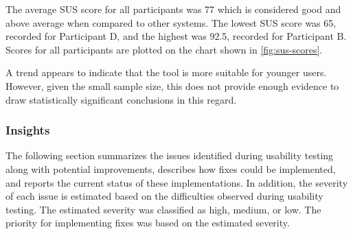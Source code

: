 The average SUS score for all participants was 77 which is considered good and above average when compared to other systems. The lowest SUS score was 65, recorded for Participant D, and the highest was 92.5, recorded for Participant B. Scores for all participants are plotted on the chart shown in \autoref{fig:sus-scores}.

A trend appears to indicate that the tool is more suitable for younger users. However, given the small sample size, this does not provide enough evidence to draw statistically significant conclusions in this regard.

\subsubsection{Insights} \label{section:insights}

The following section summarizes the issues identified during usability testing along with potential improvements, describes how fixes could be implemented, and reports the current status of these implementations. In addition, the severity of each issue is estimated based on the difficulties observed during usability testing. The estimated severity was classified as high, medium, or low. The priority for implementing fixes was based on the estimated severity.

